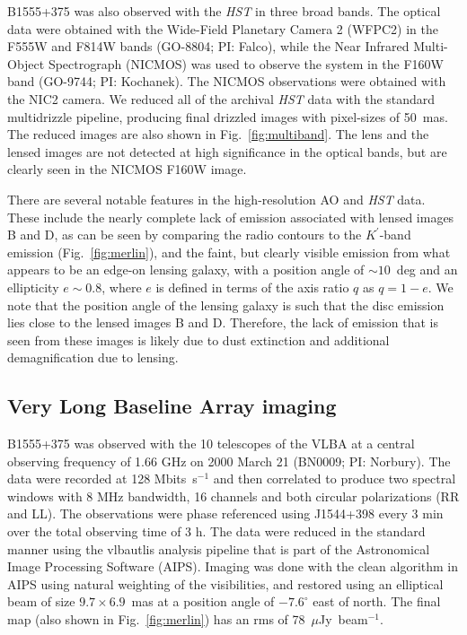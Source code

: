 \documentclass[a4paper,fleqn,usenatbib,useAMS]{mnras}
\begin{document}
B1555+375 was also observed with the {\it HST} in three broad bands.  The optical data were obtained with the Wide-Field Planetary Camera 2 (WFPC2) in the F555W and F814W bands (GO-8804; PI: Falco), while the Near Infrared Multi-Object Spectrograph (NICMOS) was used to observe the system in the F160W band (GO-9744; PI: Kochanek).  The NICMOS observations were obtained with the NIC2 camera.  We reduced all of the archival \textit{HST} data with the standard {\sc multidrizzle} pipeline, producing final drizzled images with pixel-sizes of 50~mas. The reduced images are also shown in Fig.~\ref{fig:multiband}. The lens and the lensed images are not detected at high significance in the optical bands, but are clearly seen in the NICMOS F160W image.

There are several notable features in the high-resolution AO and {\it HST} data. These include the nearly complete lack of emission associated with lensed images B and D, as can be seen by comparing the radio contours to the $K^\prime$-band emission  (Fig.~\ref{fig:merlin}), and the faint, but clearly visible emission from what appears to be an edge-on lensing galaxy, with a position angle of $\sim 10$~deg and an ellipticity $e \sim 0.8$, where $e$ is defined in terms of the axis ratio $q$ as $q=1-e$.  We note that the position angle of the lensing galaxy is such that the disc emission lies close to the lensed images B and D. Therefore, the lack of emission that is seen from these images is likely due to dust extinction and additional demagnification due to lensing. 

\subsection{Very Long Baseline Array imaging}

B1555+375 was observed with the 10 telescopes of the VLBA at a central observing frequency of 1.66 GHz on 2000 March 21 (BN0009; PI: Norbury). The data were recorded at 128 Mbits~s$^{-1}$ and then correlated to produce two spectral windows with 8 MHz bandwidth, 16 channels and both circular polarizations (RR and LL). The observations were phase referenced using J1544+398 every 3 min over the total observing time of 3 h. The data were reduced in the standard manner using the {\sc vlbautlis} analysis pipeline that is part of the Astronomical Image Processing Software (AIPS). Imaging was done with the {\sc clean} algorithm in AIPS using natural weighting of the visibilities, and restored using an elliptical beam of size $9.7 \times 6.9$~mas at a position angle of $-7.6^\circ$ east of north. The final map (also shown in Fig.~\ref{fig:merlin}) has an rms of 78~$\mu$Jy~beam$^{-1}$.
\end{document}

